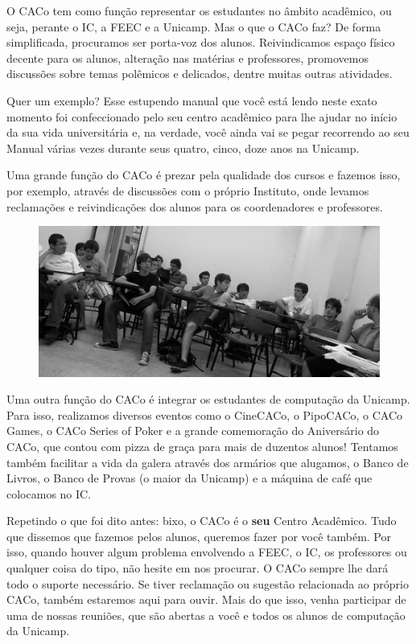 O CACo tem como função representar os estudantes no âmbito acadêmico, ou seja,
perante o IC, a FEEC e a Unicamp. Mas o que o CACo faz? De forma simplificada,
procuramos ser porta-voz dos alunos. Reivindicamos espaço físico decente para os
alunos, alteração nas matérias e professores, promovemos discussões sobre temas
polêmicos e delicados, dentre muitas outras atividades.

Quer um exemplo? Esse estupendo manual que você está lendo neste exato momento
foi confeccionado pelo seu centro acadêmico para lhe ajudar no início da sua
vida universitária e, na verdade, você ainda vai se pegar recorrendo ao seu
Manual várias vezes durante seus quatro, cinco, doze anos na Unicamp.

Uma grande função do CACo é prezar pela qualidade dos cursos e fazemos isso, por
exemplo, através de discussões com o próprio Instituto, onde levamos reclamações
e reivindicações dos alunos para os coordenadores e professores.

\begin{figure}[H]
    \centering
    \includegraphics[scale=0.21]{img/alem_da_graduacao/caco_reuniao.jpg}
\end{figure}

Uma outra função do CACo é integrar os estudantes de computação da Unicamp. Para
isso, realizamos diversos eventos como o CineCACo, o PipoCACo, o CACo Games, o
CACo Series of Poker e a grande comemoração do Aniversário do CACo, que contou
com pizza de graça para mais de duzentos alunos! Tentamos também facilitar a
vida da galera através dos armários que alugamos, o Banco de Livros, o Banco de
Provas (o maior da Unicamp) e a máquina de café que colocamos no IC.

Repetindo o que foi dito antes: bixo, o CACo é o \textbf{seu} Centro Acadêmico.
Tudo que dissemos que fazemos pelos alunos, queremos fazer por você também. Por
isso, quando houver algum problema envolvendo a FEEC, o IC, os professores ou
qualquer coisa do tipo, não hesite em nos procurar. O CACo sempre lhe dará todo
o suporte necessário. Se tiver reclamação ou sugestão relacionada ao próprio
CACo, também estaremos aqui para ouvir. Mais do que isso, venha participar de
uma de nossas reuniões, que são abertas a você e todos os alunos de computação
da Unicamp.

